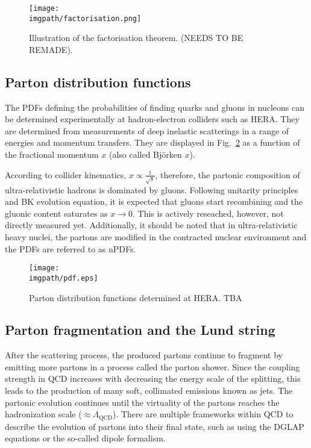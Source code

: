 \begin{figure}[H]
\texttt{[image: \\imgpath/factorisation.png]}
\caption{Illustration of the factorisation theorem. (NEEDS TO BE REMADE).}
\label{fig:intro:factorisation}
\end{figure}

\subsection{Parton distribution functions}

The PDFs defining the probabilities of finding quarks and gluons in nucleons can be determined experimentally at hadron-electron colliders such as HERA. They are determined from measurements of deep inelastic scatterings in a range of energies and momentum transfers. They are displayed in Fig.~\ref{fig:intro:pdfs} as a function of the fractional momentum $x$ (also called Bj\"orken $x$). 

According to collider kinematics, $x \propto \frac{1}{\sqrt{s}}$, therefore, the partonic composition of ultra-relativistic hadrons is dominated by gluons. Following unitarity principles and BK evolution equation, it is expected that gluons start recombining and the gluonic content saturates as $x\rightarrow0$. This is actively reseached, however, not directly measured yet. Additionally, it should be noted that in ultra-relativistic heavy nuclei, the partons are modified in the contracted nuclear environment and the PDFs are referred to as nPDFs.

\begin{figure}[H]
\texttt{[image: \\imgpath/pdf.eps]}
\caption{Parton distribution functions determined at HERA. TBA}
\label{fig:intro:pdfs}
\end{figure}

\subsection{Parton fragmentation and the Lund string}

After the scattering process, the produced partons continue to fragment by emitting more partons in a process called the parton shower. Since the coupling strength in QCD increases with decreasing the energy scale of the splitting, this leads to the production of many soft, collimated emissions known as jets. The partonic evolution continues until the virtuality of the partons reaches the hadronization scale ($\approx \Lambda_\mathrm{QCD}$). There are multiple frameworks within QCD to describe the evolution of partons into their final state, such as using the DGLAP equations or the so-called dipole formalism.

